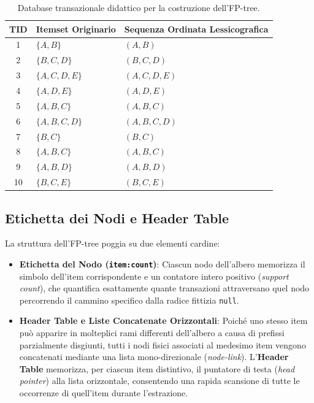 \begin{table}[H]
\centering
\caption{Database transazionale didattico per la costruzione dell'FP-tree.}
\label{tab:dm-fp-toy-dataset}
\begin{tabular}{c l l}
\toprule
\textbf{TID} & \textbf{Itemset Originario} & \textbf{Sequenza Ordinata Lessicografica} \\
\midrule
1  & $\{A, B\}$          & $(A, B)$ \\
2  & $\{B, C, D\}$       & $(B, C, D)$ \\
3  & $\{A, C, D, E\}$    & $(A, C, D, E)$ \\
4  & $\{A, D, E\}$       & $(A, D, E)$ \\
5  & $\{A, B, C\}$       & $(A, B, C)$ \\
6  & $\{A, B, C, D\}$    & $(A, B, C, D)$ \\
7  & $\{B, C\}$          & $(B, C)$ \\
8  & $\{A, B, C\}$       & $(A, B, C)$ \\
9  & $\{A, B, D\}$       & $(A, B, D)$ \\
10 & $\{B, C, E\}$       & $(B, C, E)$ \\
\bottomrule
\end{tabular}
\end{table}

\FloatBarrier
\subsection{Etichetta dei Nodi e Header Table}
La struttura dell'FP-tree poggia su due elementi cardine:
\begin{itemize}
    \item \textbf{Etichetta del Nodo (\texttt{item:count})}: Ciascun nodo dell'albero memorizza il simbolo dell'item corrispondente e un contatore intero positivo (\textit{support count}), che quantifica esattamente quante transazioni attraversano quel nodo percorrendo il cammino specifico dalla radice fittizia \texttt{null}.
    \item \textbf{Header Table e Liste Concatenate Orizzontali}: Poiché uno stesso item può apparire in molteplici rami differenti dell'albero a causa di prefissi parzialmente disgiunti, tutti i nodi fisici associati al medesimo item vengono concatenati mediante una lista mono-direzionale (\textit{node-link}). L'\textbf{Header Table} memorizza, per ciascun item distintivo, il puntatore di testa (\textit{head pointer}) alla lista orizzontale, consentendo una rapida scansione di tutte le occorrenze di quell'item durante l'estrazione.
\end{itemize}

